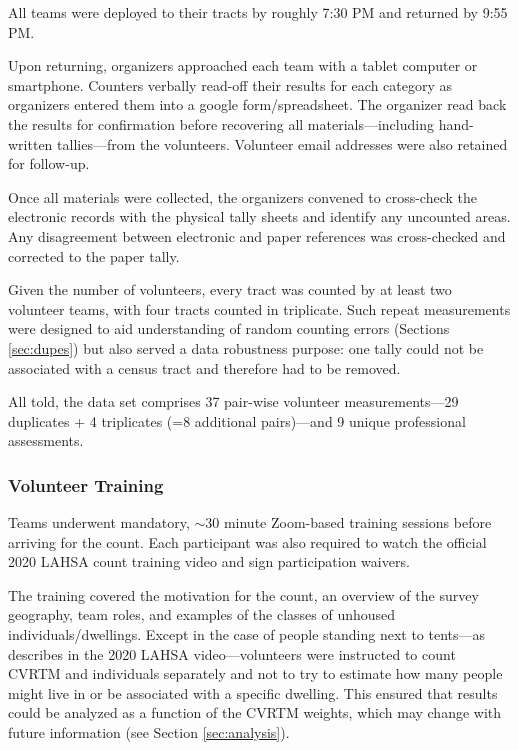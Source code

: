 \documentclass[11pt,twocolumn]{article}
\def\Count{count}
\begin{document}
All teams were deployed to their tracts by roughly 7:30 PM and returned by 9:55 PM.

Upon returning, organizers approached each team with a tablet computer or smartphone. Counters 
verbally read-off their results for each category as organizers entered them into a google 
form/spreadsheet. The organizer read back the results for confirmation before recovering all 
materials---including hand-written tallies---from the volunteers. Volunteer email addresses 
were also retained for follow-up. 

Once all materials were collected, the organizers convened to cross-check the electronic records
with the physical tally sheets and identify any uncounted areas. Any disagreement between electronic
and paper references was cross-checked and corrected to the paper tally.

Given the number of volunteers, every tract was counted by at least two volunteer teams, with four
tracts counted in triplicate. Such repeat measurements were designed to aid understanding of random 
counting errors (Sections \ref{sec:dupes}) but also served a data robustness purpose: one tally
could not be associated with a census tract and therefore had to be removed. 

All told, the data set comprises 37 pair-wise volunteer measurements---29 duplicates + 
4 triplicates (=8 additional pairs)---and 9 unique professional assessments.

\subsubsection{Volunteer Training}
\label{sec:training}

Teams underwent mandatory, $\sim$30 minute Zoom-based training sessions before arriving 
for the \Count. Each participant was also required to watch the official 2020 LAHSA count training 
video and sign participation waivers.

The training covered the motivation for the \Count, an overview of the survey geography, team roles, 
and examples of the classes of unhoused individuals/dwellings. Except in the case of people standing 
next to tents---as describes in the 2020 LAHSA video---volunteers were instructed to count 
CVRTM and individuals separately and not to try to estimate how many people might live in or be 
associated with a specific dwelling. This ensured that results could be analyzed as a function of the 
CVRTM weights, which may change with future information (see Section \ref{sec:analysis}).
\end{document}
